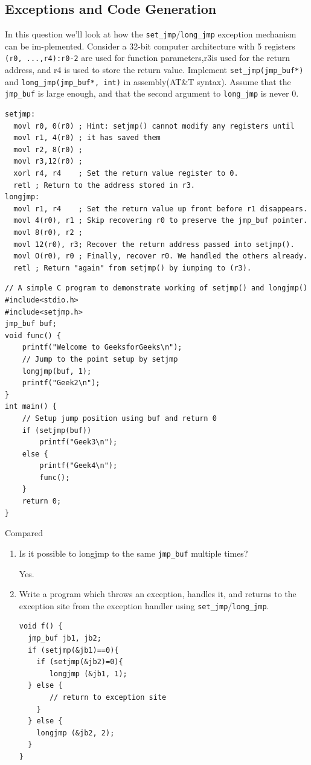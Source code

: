 \documentclass[a4paper]{exam}
\theoremstyle{definition}
\begin{document}
\subsection{Exceptions and Code Generation}
In this question we’ll look at how the \texttt{set\_jmp}/\texttt{long\_jmp} exception mechanism can be im-plemented. Consider a 32-bit computer architecture with 5 registers \texttt{(r0, ...,r4):r0-2} are used for function parameters,r3is used for the return address, and r4 is used to store the return value.  Implement \texttt{set\_jmp(jmp\_buf*)} and \texttt{long\_jmp(jmp\_buf*, int)} in assembly(AT\&T syntax).  Assume that the \texttt{jmp\_buf} is large enough, and that the second argument to \texttt{long\_jmp} is never 0. \cite{ljsj}
\begin{solution}
\begin{verbatim}
setjmp:
  movl r0, 0(r0) ; Hint: setjmp() cannot modify any registers until
  movl r1, 4(r0) ; it has saved them
  movl r2, 8(r0) ;
  movl r3,12(r0) ;
  xorl r4, r4    ; Set the return value register to 0.
  retl ; Return to the address stored in r3.
longjmp:
  movl r1, r4    ; Set the return value up front before r1 disappears.
  movl 4(r0), r1 ; Skip recovering r0 to preserve the jmp_buf pointer.
  movl 8(r0), r2 ; 
  movl 12(r0), r3; Recover the return address passed into setjmp().
  movl O(r0), r0 ; Finally, recover r0. We handled the others already.
  retl ; Return "again" from setjmp() by iumping to (r3).
\end{verbatim}
\end{solution}
\begin{verbatim}
// A simple C program to demonstrate working of setjmp() and longjmp()
#include<stdio.h>
#include<setjmp.h>
jmp_buf buf;
void func() {
    printf("Welcome to GeeksforGeeks\n");
    // Jump to the point setup by setjmp
    longjmp(buf, 1);
    printf("Geek2\n");
}
int main() {
    // Setup jump position using buf and return 0
    if (setjmp(buf))
        printf("Geek3\n");
    else {
        printf("Geek4\n");
        func();
    }
    return 0;
}
\end{verbatim}
Compared 
  \begin{enumerate}
    \item  Is it possible to longjmp to the same \texttt{jmp\_buf} multiple times?
    \begin{solution}
      Yes.
    \end{solution}
    \item  Write a program which throws an exception, handles it, and returns to the exception site from the exception handler using \texttt{set\_jmp}/\texttt{long\_jmp}.
    \begin{solution}
\begin{verbatim}
void f() {
  jmp_buf jb1, jb2;
  if (setjmp(&jb1)==0){
    if (setjmp(&jb2)=0){
       longjmp (&jb1, 1);
  } else {
       // return to exception site
    }
  } else {
    longjmp (&jb2, 2);
  }
}
\end{verbatim}
    \end{solution}
  \end{enumerate}
\end{document}
